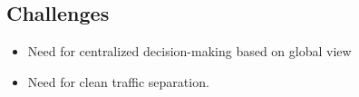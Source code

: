 \subsection{Challenges}
\label{subsec:motivation:challenges}

\begin{itemize}

\item Need for centralized decision-making based on global view

\item Need for clean traffic separation.

\end{itemize}



